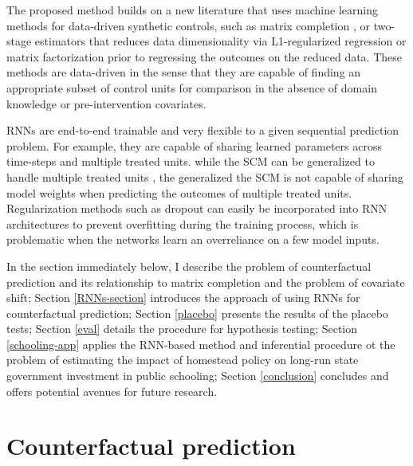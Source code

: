 \documentclass[hidelinks,12pt]{article}
\begin{document}
The proposed method builds on a new literature that uses machine learning methods for data-driven synthetic controls, such as matrix completion \citep{athey2017matrix,2019arXiv190308028P}, or two-stage estimators that reduces data dimensionality via L1-regularized regression \citep{doudchenko2016balancing,carvalho2018arco} or matrix factorization \citep{amjad2018robust} prior to regressing the outcomes on the reduced data. These methods are data-driven in the sense that they are capable of finding an appropriate subset of control units for comparison in the absence of domain knowledge or pre-intervention covariates. 

RNNs are end-to-end trainable and very flexible to a given sequential prediction problem. For example, they are capable of sharing learned parameters across time-steps and multiple treated units. while the SCM can be generalized to handle multiple treated units \citep[e.g.,][]{dube2015pooling,xu2017generalized}, the generalized the SCM is not capable of sharing model weights when predicting the outcomes of multiple treated units. Regularization methods such as dropout can easily be incorporated into RNN architectures to prevent overfitting during the training process, which is problematic when the networks learn an overreliance on a few model inputs.

In the section immediately below, I describe the problem of counterfactual prediction and its relationship to matrix completion and the problem of covariate shift; Section \ref{RNNs-section} introduces the approach of using RNNs for counterfactual prediction; Section \ref{placebo} presents the results of the placebo tests; Section \ref{eval} details the procedure for hypothesis testing; Section \ref{schooling-app} applies the RNN-based method and inferential procedure ot the problem of estimating the impact of homestead policy on long-run state government investment in public schooling; Section \ref{conclusion} concludes and offers potential avenues for future research. 

\section{Counterfactual prediction} \label{prediction}
\end{document}
